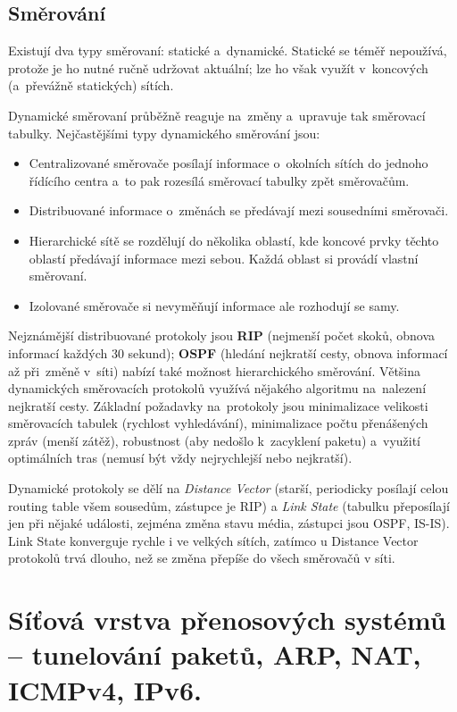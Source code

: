 \subsection{Směrování}

Existují dva typy směrovaní: statické a~dynamické. Statické se téměř nepoužívá, protože je ho nutné ručně udržovat aktuální; lze ho však využít v~koncových (a~převážně statických) sítích.

Dynamické směrovaní průběžně reaguje na~změny a~upravuje tak směrovací tabulky. Nejčastějšími typy dynamického směrování jsou:

\begin{itemize}[noitemsep]
    \item Centralizované směrovače posílají informace o~okolních sítích do jednoho řídícího centra a~to pak rozesílá směrovací tabulky zpět směrovačům.
    \item Distribuované informace o~změnách se předávají mezi sousedními směrovači.
    \item Hierarchické sítě se rozdělují do několika oblastí, kde koncové prvky těchto oblastí předávají informace mezi sebou. Každá oblast si provádí vlastní směrovaní.
    \item Izolované směrovače si nevyměňují informace ale rozhodují se samy.
\end{itemize}

Nejznámější distribuované protokoly jsou \textbf{RIP} (nejmenší počet skoků, obnova informací každých 30 sekund); \textbf{OSPF} (hledání nejkratší cesty, obnova informací až při~změně v~síti) nabízí také možnost hierarchického směrování. Většina dynamických směrovacích protokolů využívá nějakého algoritmu na~nalezení nejkratší cesty. Základní požadavky na~protokoly jsou minimalizace velikosti směrovacích tabulek (rychlost vyhledávání), minimalizace počtu přenášených zpráv (menší zátěž), robustnost (aby nedošlo k~zacyklení paketu) a~využití optimálních tras (nemusí být vždy nejrychlejší nebo nejkratší).

Dynamické protokoly se dělí na \textit{Distance Vector} (starší, periodicky posílají celou routing table všem sousedům, zástupce je RIP) a \textit{Link State} (tabulku přeposílají jen při nějaké události, zejména změna stavu média, zástupci jsou OSPF, IS-IS). Link State konverguje rychle i ve velkých sítích, zatímco u Distance Vector protokolů trvá dlouho, než se změna přepíše do všech směrovačů v síti.

\clearpage
\section{Síťová vrstva přenosových systémů -- tunelování paketů, ARP, NAT, ICMPv4, IPv6.}

